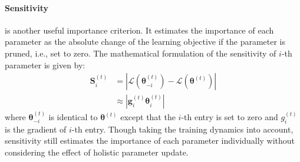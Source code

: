 \paragraph{Sensitivity} is another useful importance criterion. It estimates the importance of each parameter as the absolute change of the learning objective if the parameter is pruned, i.e., set to zero. The mathematical formulation of the sensitivity of $i$-th parameter is given by:
\begin{align}
	\bm{S}^{(t)}_i& =|\mathcal{L}(\bm{\theta}^{(t)}_{-i})-\mathcal{L}(\bm{\theta}^{(t)})| \\
	&\approx |\bm{g}_i^{(t)}\bm{\theta}^{(t)}_i|
\end{align}
where $\bm{\theta}^{(t)}_{-i}$ is identical to $\bm{\theta}^{(t)}$ except that the $i$-th entry is set to zero and $g_i^{(t)}$ is the gradient of $i$-th entry. Though taking the training dynamics into account, sensitivity still estimates the importance of each parameter individually without considering the effect of holistic parameter update.

